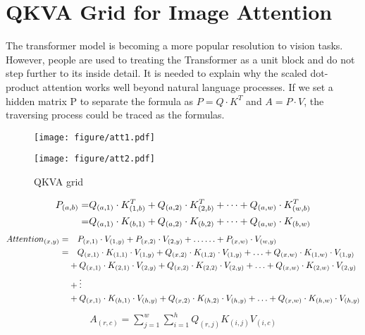 \documentclass{article}
\theoremstyle{plain}
\theoremstyle{definition}
\theoremstyle{remark}
\begin{document}
\section{QKVA Grid for Image Attention}
\label{appendix_qkva}
The transformer \cite{vaswani2017attention} model is becoming a more popular resolution to vision tasks. However, people are used to treating the Transformer as a unit block and do not step further to its inside detail. It is needed to explain why the scaled dot-product attention works well beyond natural language processes. If we set a hidden matrix P to separate the formula as $P=Q\cdot K^T$ and $A=P\cdot V$, the traversing process could be traced as the formulas. 
\begin{figure}[h]
  \centering
  \begin{minipage}[t]{0.65\textwidth}
  \centering
  \texttt{[image: figure/att1.pdf]}
  \caption{$Q\cdot K^T \cdot V$}
  \label{fig:att1}
  \end{minipage}
  \begin{minipage}[t]{0.3\textwidth} 
  \centering  
  \texttt{[image: figure/att2.pdf]}
  \caption{QKVA grid}
  \label{fig:att2}
  \end{minipage}   
\end{figure}
\begin{align}
P_{(a,b)}
=&Q_{(a,1)}\cdot K^T_{(1,b)} + Q_{(a,2)}\cdot K^T_{(2,b)} + \dots + Q_{(a,w)}\cdot K^T_{(w,b)} \\
=&Q_{(a,1)}\cdot K_{(b,1)} + Q_{(a,2)}\cdot K_{(b,2)} + \dots + Q_{(a,w)}\cdot K_{(b,w)} \notag
\end{align}
\begin{align}
Attention_{(x,y)} 
=&\quad   P_{(x,1)}\cdot V_{(1,y)} +              P_{(x,2)}\cdot V_{(2,y)} + \ldots \ldots +   {}           P_{(x,w)}\cdot V_{(w,y)} \\
=&\quad   Q_{(x,1)}\cdot  K_{(1,1)}\cdot V_{(1,y)} + Q_{(x,2)}\cdot K_{(1,2)}\cdot V_{(1,y)} + \ldots + Q_{(x,w)}\cdot K_{(1,w)}\cdot V_{(1,y)} \notag\\
 &+   Q_{(x,1)}\cdot  K_{(2,1)}\cdot V_{(2,y)} + Q_{(x,2)}\cdot K_{(2,2)}\cdot V_{(2,y)} + \ldots + Q_{(x,w)}\cdot K_{(2,w)}\cdot V_{(2,y)} \notag\\
 &+   \vdots         	                                                                                 \notag\\
 &+   Q_{(x,1)}\cdot  K_{(h,1)}\cdot V_{(h,y)} + Q_{(x,2)}\cdot K_{(h,2)}\cdot V_{(h,y)} + \ldots + Q_{(x,w)}\cdot K_{(h,w)}\cdot V_{(h,y)} \notag
\end{align}
\begin{align}
A_{(r,c)}=\sum_{j=1}^w \sum_{i=1}^h Q_{(r,j)}K_{(i,j)}V_{(i,c)} 
\end{align}
\end{document}
